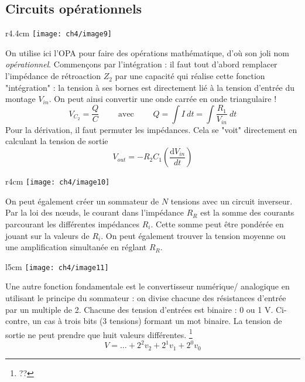 	\subsection{Circuits opérationnels}
	\begin{wrapfigure}[9]{r}{4.4cm}
	\vspace{-1.2cm}
	\texttt{[image: ch4/image9]}
	\end{wrapfigure}
	On utilise ici l'OPA pour faire des opérations mathématique, d'où son 
	joli nom \textit{opérationnel}. Commençons par l'intégration : il faut 
	tout d'abord remplacer l'impédance de rétroaction $Z_2$ par une 
	capacité qui réalise cette fonction "intégration" : la tension à ses 
	bornes est directement lié à la tension d'entrée du montage $V_{in}$. 
	On peut ainsi convertir une onde carrée en onde triangulaire ! 
	\begin{equation}
	V_{C_2} = \dfrac{Q}{C}\qquad \text{ avec }\qquad Q = \int I\ dt = \int 
	\dfrac{R_1}{V_{in}}\ dt
	\end{equation}		
	\newpage
	Pour la 
	dérivation, il faut permuter les impédances. Cela se "voit" directement 
	en calculant la tension de sortie
	\begin{equation}
	V_{out} = -R_2C_1\left(\dfrac{\text{d}V_{in}}{dt}\right)
	\end{equation}
		\begin{wrapfigure}[7]{r}{4cm}
	\vspace{-0.5cm}
	\texttt{[image: ch4/image10]}
	\end{wrapfigure}
	On peut également créer un sommateur de $N$ tensions avec un circuit 
	inverseur. Par la loi des nœuds, le courant dans l'impédance $R_R$ est 
	la somme des courants parcourant les différentes impédances $R_i$. Cette 
	somme peut être pondérée en jouant sur la valeurs de $R_i$. On peut 
	également trouver la tension moyenne ou une amplification simultanée en 
	réglant $R_R$.\\
	
	\begin{wrapfigure}[9]{l}{5cm}
	\vspace{-0.5cm}
	\texttt{[image: ch4/image11]}
	\end{wrapfigure}
	Une autre fonction fondamentale est le convertisseur numérique/
	analogique	en utilisant le principe du sommateur : on divise chacune des 
	résistances d'entrée par un multiple de 2. Chacune des tension d'entrées 
	est binaire : 0 ou 1 V. Ci-contre, un cas à trois bits (3 tensions) formant un 
	mot binaire. La tension de sortie ne peut prendre que huit valeurs différentes.
	\footnote{??}
	\begin{equation}
	V = \dots + 2^2 v_2 + 2^1v_1 + 2^0 v_0
	\end{equation}
	
